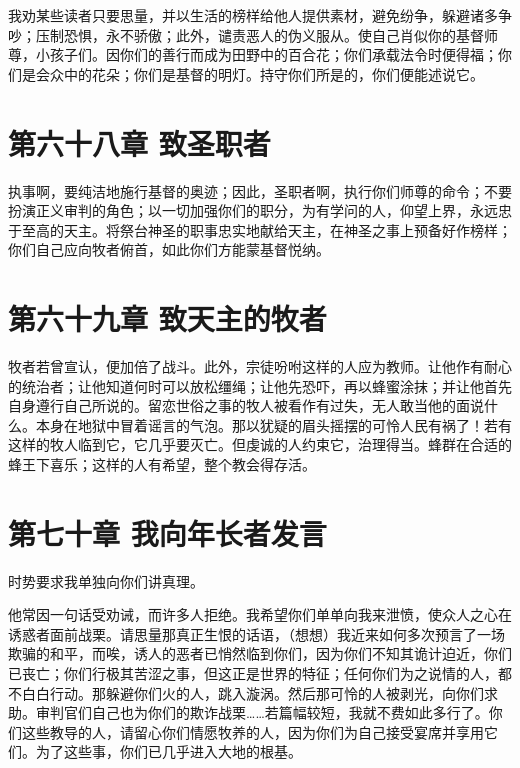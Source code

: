 我劝某些读者只要思量，并以生活的榜样给他人提供素材，避免纷争，躲避诸多争吵；压制恐惧，永不骄傲；此外，谴责恶人的伪义服从。使自己肖似你的基督师尊，小孩子们。因你们的善行而成为田野中的百合花；你们承载法令时便得福；你们是会众中的花朵；你们是基督的明灯。持守你们所是的，你们便能述说它。\par


\section{第六十八章  致圣职者}

执事啊，要纯洁地施行基督的奥迹；因此，圣职者啊，执行你们师尊的命令；不要扮演正义审判的角色；以一切加强你们的职分，为有学问的人，仰望上界，永远忠于至高的天主。将祭台神圣的职事忠实地献给天主，在神圣之事上预备好作榜样；你们自己应向牧者俯首，如此你们方能蒙基督悦纳。\par


\section{第六十九章  致天主的牧者}

牧者若曾宣认，便加倍了战斗。此外，宗徒吩咐这样的人应为教师。让他作有耐心的统治者；让他知道何时可以放松缰绳；让他先恐吓，再以蜂蜜涂抹；并让他首先自身遵行自己所说的。留恋世俗之事的牧人被看作有过失，无人敢当他的面说什么。本身在地狱中冒着谣言的气泡。那以犹疑的眉头摇摆的可怜人民有祸了！若有这样的牧人临到它，它几乎要灭亡。但虔诚的人约束它，治理得当。蜂群在合适的蜂王下喜乐；这样的人有希望，整个教会得存活。\par


\section{第七十章  我向年长者发言}

时势要求我单独向你们讲真理。\par

他常因一句话受劝诫，而许多人拒绝。我希望你们单单向我来泄愤，使众人之心在诱惑者面前战栗。请思量那真正生恨的话语，（想想）我近来如何多次预言了一场欺骗的和平，而唉，诱人的恶者已悄然临到你们，因为你们不知其诡计迫近，你们已丧亡；你们行极其苦涩之事，但这正是世界的特征；任何你们为之说情的人，都不白白行动。那躲避你们火的人，跳入漩涡。然后那可怜的人被剥光，向你们求助。审判官们自己也为你们的欺诈战栗……若篇幅较短，我就不费如此多行了。你们这些教导的人，请留心你们情愿牧养的人，因为你们为自己接受宴席并享用它们。为了这些事，你们已几乎进入大地的根基。\par

